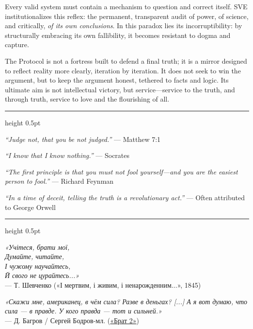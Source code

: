 \documentclass[11pt,a4paper]{article}
\theoremstyle{definition}
\theoremstyle{remark}
\begin{document}
\begin{small}
\begin{enumerate}
\begin{protocol}
Every valid system must contain a mechanism to question and correct itself. SVE institutionalizes this reflex: the permanent, transparent audit of power, of science, and critically, \textit{of its own conclusions}. In this paradox lies its incorruptibility: by structurally embracing its own fallibility, it becomes resistant to dogma and capture.

The Protocol is not a fortress built to defend a final truth; it is a mirror designed to reflect reality more clearly, iteration by iteration. It does not seek to win the argument, but to keep the argument honest, tethered to facts and logic. Its ultimate aim is not intellectual victory, but service—service to the truth, and through truth, service to love and the flourishing of all.

\vspace{2em}

\begin{center}
\begin{minipage}{0.9\textwidth}
\hrule height 0.5pt
\vspace{1em}

\noindent\textit{``Judge not, that you be not judged.''} --- Matthew 7:1

\vspace{0.6em}
\noindent\textit{``I know that I know nothing.''} --- Socrates

\vspace{0.6em}
\noindent\textit{``The first principle is that you must not fool yourself—and you are the easiest person to fool.''} --- Richard Feynman

\vspace{0.6em}
\noindent\textit{``In a time of deceit, telling the truth is a revolutionary act.''} --- Often attributed to George Orwell

\vspace{1em}
\hrule height 0.5pt
\vspace{1em}

{\selectfont
\noindent\textit{«Учітеся, брати мої,\\
Думайте, читайте,\\
І чужому научайтесь,\\
Й свого не цурайтесь...»}\\
--- Т. Шевченко («І мертвим, і живим, і ненарожденним...», 1845)

\vspace{0.8em}
\noindent\textit{«Скажи мне, американец, в чём сила? Разве в деньгах? [...] А я вот думаю, что сила — в правде. У кого правда — тот и сильней.»}\\
--- Д. Багров / Сергей Бодров-мл. (\href{https://youtu.be/fz6lGsgEGZ8}{«Брат 2»})
}


\end{minipage}
\end{center}
\end{protocol}
\end{enumerate}
\end{small}
\end{document}
